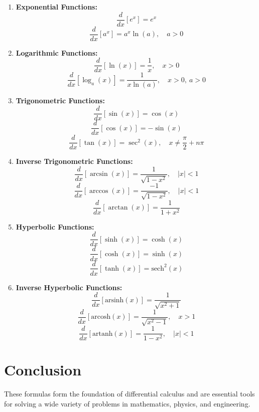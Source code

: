 \documentclass[a4paper,12pt]{article}
\begin{document}
\begin{enumerate}
    \item \textbf{Exponential Functions:}
    \[ \frac{d}{dx}[e^x] = e^x \]
    \[ \frac{d}{dx}[a^x] = a^x \ln(a), \quad a > 0 \]

    \item \textbf{Logarithmic Functions:}
    \[ \frac{d}{dx}[\ln(x)] = \frac{1}{x}, \quad x > 0 \]
    \[ \frac{d}{dx}[\log_a(x)] = \frac{1}{x \ln(a)}, \quad x > 0, \ a > 0 \]

    \item \textbf{Trigonometric Functions:}
    \[ \frac{d}{dx}[\sin(x)] = \cos(x) \]
    \[ \frac{d}{dx}[\cos(x)] = -\sin(x) \]
    \[ \frac{d}{dx}[\tan(x)] = \sec^2(x), \quad x \neq \frac{\pi}{2} + n\pi \]

    \item \textbf{Inverse Trigonometric Functions:}
    \[ \frac{d}{dx}[\arcsin(x)] = \frac{1}{\sqrt{1-x^2}}, \quad |x| < 1 \]
    \[ \frac{d}{dx}[\arccos(x)] = \frac{-1}{\sqrt{1-x^2}}, \quad |x| < 1 \]
    \[ \frac{d}{dx}[\arctan(x)] = \frac{1}{1+x^2} \]

    \item \textbf{Hyperbolic Functions:}
    \[ \frac{d}{dx}[\sinh(x)] = \cosh(x) \]
    \[ \frac{d}{dx}[\cosh(x)] = \sinh(x) \]
    \[ \frac{d}{dx}[\tanh(x)] = \text{sech}^2(x) \]

    \item \textbf{Inverse Hyperbolic Functions:}
    \[ \frac{d}{dx}[\text{arsinh}(x)] = \frac{1}{\sqrt{x^2+1}} \]
    \[ \frac{d}{dx}[\text{arcosh}(x)] = \frac{1}{\sqrt{x^2-1}}, \quad x > 1 \]
    \[ \frac{d}{dx}[\text{artanh}(x)] = \frac{1}{1-x^2}, \quad |x| < 1 \]
\end{enumerate}

\section*{Conclusion}
These formulas form the foundation of differential calculus and are essential tools for solving a wide variety of problems in mathematics, physics, and engineering.
\end{document}
